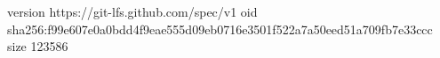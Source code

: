 version https://git-lfs.github.com/spec/v1
oid sha256:f99e607e0a0bdd4f9eae555d09eb0716e3501f522a7a50eed51a709fb7e33ccc
size 123586
